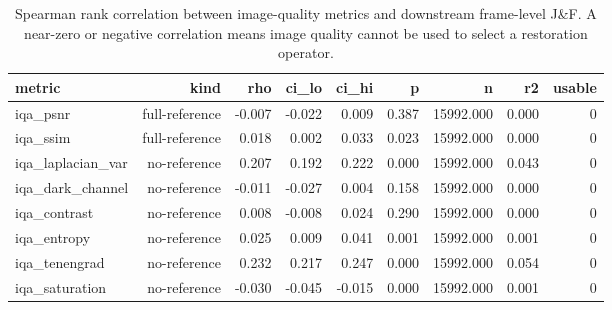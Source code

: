 \begin{table}[t]
\centering
\caption{Spearman rank correlation between image-quality metrics and downstream frame-level J\&F. A near-zero or negative correlation means image quality cannot be used to select a restoration operator.}
\label{tab:iqa_corr}
\begin{tabular}{lrrrrrrrr}
\toprule
metric & kind & rho & ci\_lo & ci\_hi & p & n & r2 & usable \\
\midrule
iqa\_psnr & full-reference & -0.007 & -0.022 & 0.009 & 0.387 & 15992.000 & 0.000 & 0 \\
iqa\_ssim & full-reference & 0.018 & 0.002 & 0.033 & 0.023 & 15992.000 & 0.000 & 0 \\
iqa\_laplacian\_var & no-reference & 0.207 & 0.192 & 0.222 & 0.000 & 15992.000 & 0.043 & 0 \\
iqa\_dark\_channel & no-reference & -0.011 & -0.027 & 0.004 & 0.158 & 15992.000 & 0.000 & 0 \\
iqa\_contrast & no-reference & 0.008 & -0.008 & 0.024 & 0.290 & 15992.000 & 0.000 & 0 \\
iqa\_entropy & no-reference & 0.025 & 0.009 & 0.041 & 0.001 & 15992.000 & 0.001 & 0 \\
iqa\_tenengrad & no-reference & 0.232 & 0.217 & 0.247 & 0.000 & 15992.000 & 0.054 & 0 \\
iqa\_saturation & no-reference & -0.030 & -0.045 & -0.015 & 0.000 & 15992.000 & 0.001 & 0 \\
\bottomrule
\end{tabular}
\end{table}

